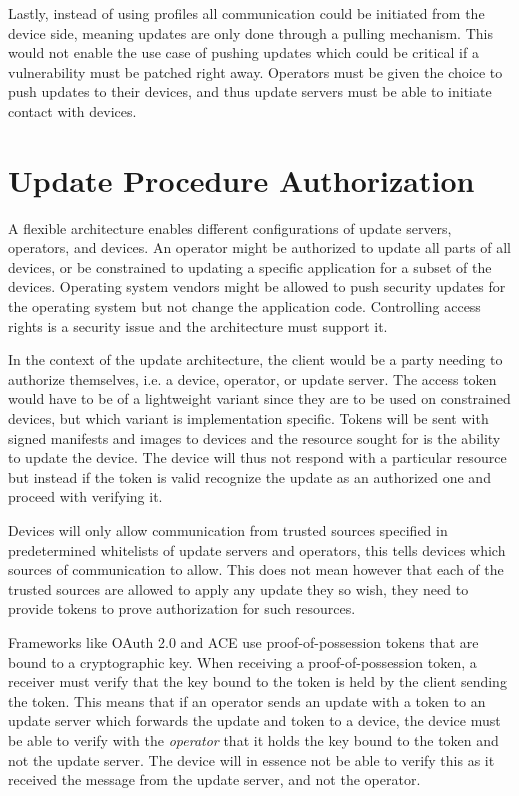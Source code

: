 \documentclass[0-thesis.tex]{subfiles}
\begin{document}
Lastly, instead of using profiles all communication could be initiated from the device
side, meaning updates are only done through a pulling mechanism. This would not enable the
use case of pushing updates which could be critical if a vulnerability must be patched
right away. Operators must be given the choice to push updates to their devices, and thus
update servers must be able to initiate contact with devices.

\section{Update Procedure Authorization}
\label{sec:authorization}
A flexible architecture enables different configurations of update servers, operators, and
devices. An operator might be authorized to update all parts of all devices, or be
constrained to updating a specific application for a subset of the devices. Operating
system vendors might be allowed to push security updates for the operating system but not
change the application code. Controlling access rights is a security issue and the
architecture must support it.

In the context of the update architecture, the client would be a party needing to
authorize themselves, i.e. a device, operator, or update server. The access token would
have to be of a lightweight variant since they are to be used on constrained devices, but
which variant is implementation specific. Tokens will be sent with signed manifests and
images to devices and the resource sought for is the ability to update the device. The
device will thus not respond with a particular resource but instead if the token is valid
recognize the update as an authorized one and proceed with verifying it. 

Devices will only allow communication from trusted sources specified in predetermined
whitelists of update servers and operators, this tells devices which sources of
communication to allow. This does not mean however that each of the trusted sources are
allowed to apply any update they so wish, they need to provide tokens to prove
authorization for such resources.

Frameworks like OAuth 2.0 and ACE use proof-of-possession tokens that are bound to a
cryptographic key. When receiving a proof-of-possession token, a receiver must verify that
the key bound to the token is held by the client sending the token. This means that if an
operator sends an update with a token to an update server which forwards the update and
token to a device, the device must be able to verify with the \textit{operator} that it
holds the key bound to the token and not the update server. The device will in essence not
be able to verify this as it received the message from the update server, and not the
operator.
\end{document}
